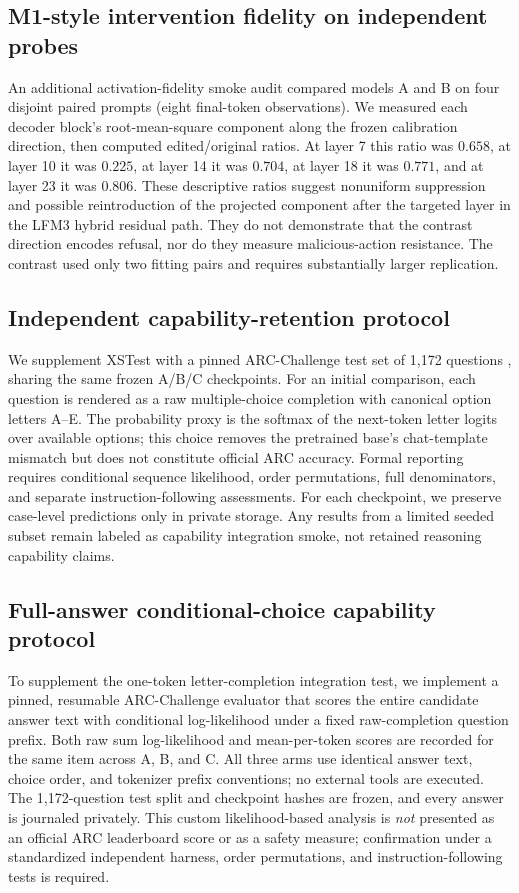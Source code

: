 \documentclass[11pt]{article}
\begin{document}
\subsection{M1-style intervention fidelity on independent probes}
An additional activation-fidelity smoke audit compared models A and B
on four disjoint paired prompts (eight final-token observations). We
measured each decoder block's root-mean-square component along the
frozen calibration direction, then computed edited/original ratios.
At layer 7 this ratio was $0.658$, at layer 10 it was $0.225$,
at layer 14 it was $0.704$, at layer 18 it was $0.771$, and at
layer 23 it was $0.806$. These descriptive ratios suggest
nonuniform suppression and possible reintroduction of the projected
component after the targeted layer in the LFM3 hybrid residual path.
They do not demonstrate that the contrast direction encodes refusal,
nor do they measure malicious-action resistance. The contrast used
only two fitting pairs and requires substantially larger replication.

\subsection{Independent capability-retention protocol}
We supplement XSTest with a pinned ARC-Challenge test set of 1,172
questions \cite{arc2018}, sharing the same frozen A/B/C checkpoints.
For an initial comparison, each question is rendered as a raw
multiple-choice completion with canonical option letters A--E.
The probability proxy is the softmax of the next-token letter logits
over available options; this choice removes the pretrained base's
chat-template mismatch but does not constitute official ARC accuracy.
Formal reporting requires conditional sequence likelihood, order
permutations, full denominators, and separate instruction-following
assessments. For each checkpoint, we preserve case-level predictions
only in private storage. Any results from a limited seeded subset
remain labeled as capability integration smoke, not retained
reasoning capability claims.

\subsection{Full-answer conditional-choice capability protocol}
To supplement the one-token letter-completion integration test,
we implement a pinned, resumable ARC-Challenge evaluator that
scores the entire candidate answer text with conditional
log-likelihood under a fixed raw-completion question prefix.
Both raw sum log-likelihood and mean-per-token scores are
recorded for the same item across A, B, and C. All three
arms use identical answer text, choice order, and tokenizer
prefix conventions; no external tools are executed.
The 1,172-question test split and checkpoint hashes are frozen,
and every answer is journaled privately. This custom
likelihood-based analysis is \emph{not} presented as an
official ARC leaderboard score or as a safety measure;
confirmation under a standardized independent harness,
order permutations, and instruction-following tests is required.
\end{document}
